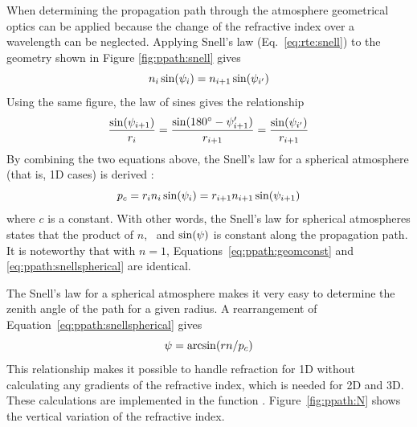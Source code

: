 When determining the propagation path through the atmosphere
geometrical optics can be applied because the change of the refractive
index over a wavelength can be neglected. Applying Snell's law
(Eq.~\ref{eq:rte:snell}) to the geometry shown in Figure
\ref{fig:ppath:snell} gives
\begin{equation}
  n_i \sin (\psi_{i}) = n_{i+1} \sin (\psi_{i'})
\end{equation}
Using the same figure, the law of sines gives the relationship
\begin{equation}
  \frac{\sin(\psi_{i+1})}{r_{i}} = 
  \frac{\sin(180^\circ-\psi_{i+1}')}{r_{i+1}} =
  \frac{\sin(\psi_{i'})}{r_{i+1}} 
\end{equation}
By combining the two equations above, the Snell's law for a spherical
atmosphere (that is, 1D cases) is derived
\citep[e.g.][]{kyle:91,balluch:97}:
\begin{equation}
  p_c = r_{i} n_i \sin(\psi_{i}) = r_{i+1} n_{i+1}\sin(\psi_{i+1}) 
 \label{eq:ppath:snellspherical}
\end{equation}
where $c$ is a constant. With other words, the Snell's law for
spherical atmospheres states that the product of $n$, \Rds\ and
$\sin(\psi)$ is constant along the propagation path. It is
noteworthy that with $n=1$, Equations~\ref{eq:ppath:geomconst} and
\ref{eq:ppath:snellspherical} are identical.

The Snell's law for a spherical atmosphere makes it very easy to
determine the zenith angle of the path for a given radius. A
rearrangement of Equation~\ref{eq:ppath:snellspherical} gives
\begin{equation}
  \psi = \arcsin( r n / p_c )
 \label{eq:ppath:za1D}
\end{equation}
This relationship makes it possible to handle refraction for 1D
without calculating any gradients of the refractive index, which is
needed for 2D and 3D. These calculations are implemented in the
function .
Figure~\ref{fig:ppath:N} shows the vertical variation of the
refractive index.





